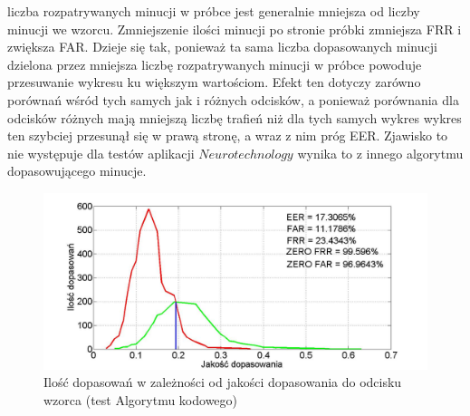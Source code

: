 liczba rozpatrywanych minucji w próbce jest generalnie mniejsza od liczby minucji we wzorcu. Zmniejszenie ilości minucji po stronie próbki zmniejsza FRR i zwiększa FAR. Dzieje się tak, ponieważ ta sama liczba dopasowanych minucji dzielona przez mniejsza liczbę rozpatrywanych minucji w próbce powoduje przesuwanie wykresu ku większym wartościom. Efekt ten dotyczy zarówno porównań wśród tych samych jak i różnych odcisków, a ponieważ porównania dla odcisków różnych mają mniejszą liczbę trafień niż dla tych samych wykres wykres ten szybciej przesunął się w prawą stronę, a wraz z nim próg EER. Zjawisko to nie występuje dla testów aplikacji $Neurotechnology$ wynika to z innego algorytmu dopasowującego minucje.
\begin{figure}[!ht]
    \begin{center}
		\includegraphics[angle=0,scale=0.27]{img/pattern_line_statistic_analyses_code_way.jpg}
		\caption{Ilość dopasowań w zależności od jakości dopasowania do odcisku wzorca (test Algorytmu kodowego)}
		\label{img:code_stat_line_pattern}
    \end{center}
\end{figure} 

